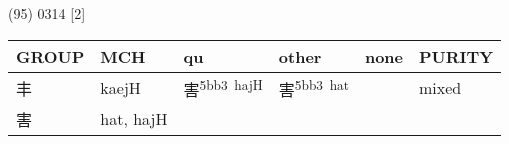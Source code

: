 \documentclass[14pt,a4paper]{scrartcl}
\begin{document}
(95) 0314 {[}2{]}

\begin{longtable}[c]{@{}llllll@{}}
\toprule
\begin{minipage}[b]{0.14\columnwidth}\raggedright\strut
GROUP
\strut\end{minipage} &
\begin{minipage}[b]{0.14\columnwidth}\raggedright\strut
MCH
\strut\end{minipage} &
\begin{minipage}[b]{0.14\columnwidth}\raggedright\strut
qu
\strut\end{minipage} &
\begin{minipage}[b]{0.14\columnwidth}\raggedright\strut
other
\strut\end{minipage} &
\begin{minipage}[b]{0.14\columnwidth}\raggedright\strut
none
\strut\end{minipage} &
\begin{minipage}[b]{0.14\columnwidth}\raggedright\strut
PURITY
\strut\end{minipage}\tabularnewline
\midrule
\endhead
\begin{minipage}[t]{0.14\columnwidth}\raggedright\strut
丰
\strut\end{minipage} &
\begin{minipage}[t]{0.14\columnwidth}\raggedright\strut
kaejH
\strut\end{minipage} &
\begin{minipage}[t]{0.14\columnwidth}\raggedright\strut
害\textsuperscript{5bb3~hajH}
\strut\end{minipage} &
\begin{minipage}[t]{0.14\columnwidth}\raggedright\strut
害\textsuperscript{5bb3~hat}
\strut\end{minipage} &
\begin{minipage}[t]{0.14\columnwidth}\raggedright\strut
\strut\end{minipage} &
\begin{minipage}[t]{0.14\columnwidth}\raggedright\strut
mixed
\strut\end{minipage}\tabularnewline
\begin{minipage}[t]{0.14\columnwidth}\raggedright\strut
害
\strut\end{minipage} &
\begin{minipage}[t]{0.14\columnwidth}\raggedright\strut
hat, hajH
\strut\end{minipage} &
\begin{minipage}[t]{0.14\columnwidth}\raggedright\strut

\end{minipage}
\end{longtable}
\end{document}
